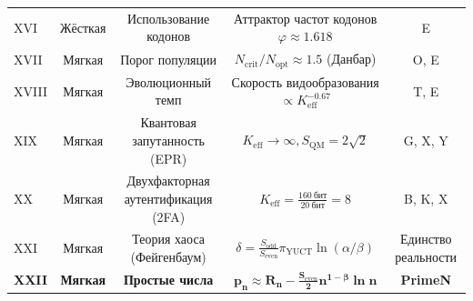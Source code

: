 \documentclass[12pt,a4paper]{article}
\begin{document}
\begin{table}[htbp]
\begin{tabular}{l c c c c}
			XVI & Жёсткая & Использование кодонов & Аттрактор частот кодонов \(\varphi \approx 1.618\) & E \\
			XVII& Мягкая & Порог популяции & \(N_{\mathrm{crit}}/N_{\mathrm{opt}} \approx 1.5\) (Данбар) & O, E \\
			XVIII&Мягкая & Эволюционный темп & Скорость видообразования \(\propto K_{\mathrm{eff}}^{-0.67}\) & T, E \\
			XIX & Мягкая & Квантовая запутанность (EPR) & \(K_{\mathrm{eff}} \to \infty, S_{\mathrm{QM}} = 2\sqrt{2}\) & G, X, Y \\
			XX  & Мягкая & Двухфакторная аутентификация (2FA) & \(K_{\mathrm{eff}} = \frac{160\ \text{бит}}{20\ \text{бит}} = 8\) & B, K, X \\
			XXI & Мягкая & Теория хаоса (Фейгенбаум) & \(\delta = \frac{S_{\mathrm{odd}}}{S_{\mathrm{even}}} \pi_{\mathrm{YUCT}} \ln(\alpha/\beta)\) & Единство реальности \\
			\textbf{XXII} & \textbf{Мягкая} & \textbf{Простые числа} & \(\mathbf{p_n \approx R_n - \frac{S_{\mathrm{even}}}{2}n^{1-\beta}\ln n}\) & \textbf{PrimeN} \\
			\bottomrule
		\end{tabular}
	\end{table}
	
\end{document}
